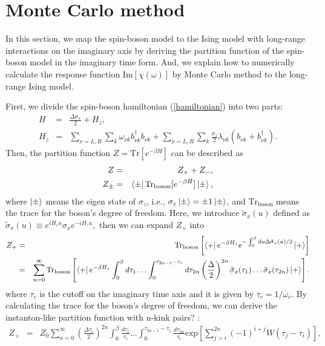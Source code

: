 \section{Monte Carlo method}
In this section, we map the spin-boson model to the Ising model with long-range interactions on the imaginary axis by deriving the partition function of the spin-boson model in the imaginary time form.
And, we explain how to numerically calculate the response function $\mathrm{Im}[\chi(\omega)]$ by Monte Carlo method to the long-range Ising model.

First, we divide the spin-boson hamiltonian (\ref{hamiltonian}) into two parts:
\begin{eqnarray}
	H&=&\frac{\Delta\sigma_x}{2}+H_z,\\
	H_z&=&\sum_{\nu=L,R}\sum_k\omega_{\nu k } b_{\nu k}^{\dagger} b_{\nu k}+\sum_{\nu=L,R}\sum_k \frac{\sigma_z}{2}\lambda_{\nu k}(b_{\nu k}+b_{\nu k}^{\dagger}).
\end{eqnarray}
Then, the partition function $Z=\mathrm{Tr}[e^{-\beta H}]$ can be described as
 \begin{eqnarray}
	Z&=&Z_++Z_-,\\
	Z_{\pm}&=&\bra{\pm}\mathrm{Tr_{\mathrm{boson}}}[e^{-\beta H}]\ket{\pm},
\end{eqnarray}
where $\ket{\pm}$ means the eigen state of $\sigma_z$, i.e., $\sigma_z\ket{\pm}=\pm1\ket{\pm}$, 
and  $\mathrm{Tr_{\mathrm{boson}}}$ means the trace for the boson's degree of freedom.
Here, we introduce $\tilde{\sigma}_x(u)$ defined as  
$
\tilde{\sigma}_x(u)\equiv e^{iH_zu}\sigma_xe^{-iH_zu},
$
then we can expand $Z_+$ into
\begin{eqnarray}
	Z_+&=&\mathrm{Tr_{\mathrm{boson}}}\left[\bra{+}e^{-\beta H_z}e^{-\int_{0}^{\beta}du \Delta \tilde{\sigma}_{x}(u)/2}\ket{+}\right]\\
	&=&\sum_{n=0}^{\infty}\mathrm{Tr_{\mathrm{boson}}}
	\left[\bra{+}e^{-\beta H_z }\int_{0}^{\beta}d\tau_1 \ldots \int_{0}^{\tau_{2n-1}-\tau_c} d\tau_{2n}
	\left(\frac{\Delta}{2}\right)^{2n}\tilde{\sigma}_x(\tau_1) \ldots \tilde{\sigma}_x(\tau_{2n})\ket{+}\right].
\end{eqnarray}
where $\tau_c$ is the cutoff on the imaginary time axis and it is given by $\tau_c=1/\omega_c$.
By calculating the trace for the boson's degree of freedom, we can derive the instanton-like partition function with n-kink pairs? \cite{Leggett87,Volker98}:
\begin{eqnarray}
	Z_+&=&Z_0\sum_{n=0}^{\infty}\left(\frac{\Delta\tau_c}{2}\right)^{2n}\int_{0}^{\beta}\frac{d\tau_1}{\tau_c} \ldots \int_{0}^{\tau_{2n-1}-\tau_c} \frac{d\tau_{2n}}{\tau_c}
	\mathrm{exp}\left[\sum_{j>i}^{2n}(-1)^{i+j}W(\tau_j-\tau_i)\right],
	\label{z_+}
\end{eqnarray}
